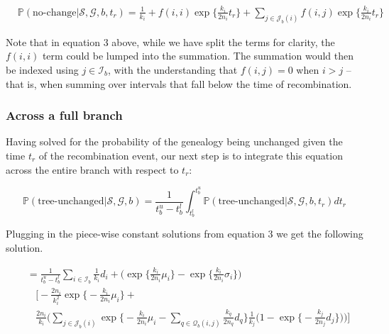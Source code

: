 \documentclass[11pt]{article}
\begin{document}

\begin{equation}\tag{3}
\begin{aligned}
	&\mathbb{P}(\text{no-change} | \mathcal{S},\mathcal{G},b,t_r) = 
	\frac{1}{k_i} + f(i,i) \exp \bigg\{\frac{k_i}{2n_i} t_r\bigg\} +
	\sum_{j \in \mathcal{J}_b(i)} f(i,j) \exp\bigg\{\frac{k_i}{2n_i}t_r\bigg\} 
\end{aligned}
\end{equation}

\noindent Note that in equation 3 above, while we have split the terms for clarity, 
the $f(i,i)$ term could be lumped into the summation. The summation would then be indexed 
using $j \in \mathcal{I}_b$, with the understanding that $f(i,j)=0$ when $i>j$ -- 
that is, when summing over intervals that fall below the time of recombination.


\subsubsection{Across a full branch}
Having solved for the probability of the genealogy being unchanged given the 
time $t_r$ of the recombination event, our next step is to integrate this equation
across the entire branch with respect to $t_r$:

\begin{equation}
	\mathbb{P}(\text{tree-unchanged} | \mathcal{S}, \mathcal{G}, b) = 
		\frac{1}{t_b^u - t_b^l} 
		\int_{t_b^l}^{t_b^u} 
		\mathbb{P}(\text{tree-unchanged} | \mathcal{S}, \mathcal{G}, b, t_r) dt_r
\end{equation}

\noindent Plugging in the piece-wise constant solutions from equation 3
we get the following solution.

\begin{equation}
\begin{aligned}
	&= \frac{1}{t^u_b-t^l_b}
	\sum_{i \in \mathcal{I}_b}
	\frac{1}{k_i}d_i + 
	\bigg(
		\exp \bigg\{ \frac{k_i}{2n_i} \mu_{i} \bigg\}
		-\exp \bigg\{ \frac{k_i}{2n_i} \sigma_i	\bigg\}
	\bigg)\\
	&~~~~\Bigg[
		-\frac{2n_i}{k_i^2}
		\exp \bigg\{ -\frac{k_i}{2n_i} \mu_{i} \bigg\} + 
		\\
		&~~~~\frac{2n_i}{k_i}
		\Bigg(
			\sum_{j \in \mathcal{J}_b(i)}
			\exp \bigg\{
				-\frac{k_i}{2n_i} \mu_{i} -
				\sum_{q \in \mathcal{Q}_b(i,j)}
				\frac{k_q}{2n_q} d_q
				\bigg\}
			\frac{1}{k_j} \bigg(1- \exp \bigg\{-\frac{k_j}{2n_j} d_j \bigg\} \bigg)
		\Bigg)
	\Bigg]
\end{aligned}
\end{equation}
\end{document}
